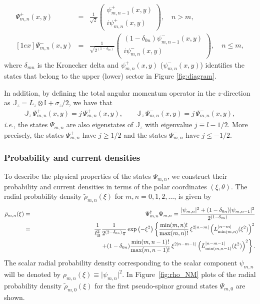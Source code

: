 \documentclass[aps,showpacs,showkeys]{revtex4}
\begin{document}
\begin{eqnarray}
\label{34aaa}
\Psi_{m,n}^{+}(x,y)&=&\frac{1}{\sqrt{2}}\left(\begin{array}{c}
\psi_{m,n-1}^{+}(x,y)\\
i\psi_{m,n}^{+}(x,y)
\end{array}\right), \quad n> m, 
\\ [1ex]
\Psi_{m,n}^{-}(x,y)&=&\frac{1}{\sqrt{2^{(1-\delta_{0n})}}}\left(\begin{array}{c}
(1-\delta_{0n})\psi_{m,n-1}^{-}(x,y)\\
i\psi_{m,n}^{-}(x,y)
\end{array}\right), \quad n\leq m,
\label{34bbb}
\end{eqnarray}
where $\delta_{mn}$ is the Kronecker delta and $\psi^+_{m,n}(x,y)$  ($\psi^-_{m,n}(x,y)$) identifies the states that belong to the upper (lower) sector in Figure \ref{fig:diagram}.


In addition, by defining the total angular momentum operator in the $z$-direction as $\mathbb{J}_z=L_z\otimes\mathbb{I}+\sigma_z/2$, we have that
\begin{eqnarray}\label{36}
 \mathbb{J}_z\,\Psi_{m,n}^{+}(x,y)=j\,\Psi_{m,n}^{+}(x,y), \qquad \mathbb{J}_z\,\Psi_{m,n}^{-}(x,y)=j\,\Psi_{m,n}^{-}(x,y), 
\end{eqnarray}
{\it i.e.}, the states $\Psi_{m,n}$ are also eigenstates of $\mathbb{J}_z$ with eigenvalue $j\equiv l-1/2$. More precisely, the states $\Psi_{m,n}^+$ have $j\geq 1/2$ and the states  $\Psi_{m,n}^-$ have  $j\leq-1/2$.


\subsubsection{Probability and current densities}\label{sec2.2.1}
To describe the physical properties of the states  $\Psi_{m,n}$, we construct their probability and current densities in terms of the polar coordinates $(\xi,\theta)$.
The radial probability density $\tilde{\rho}_{m,n}(\xi)$ for $m,n=0,1,2,\dots$, is given by
\begin{eqnarray}
 \nonumber\tilde{\rho}_{m,n}(\xi)&=&\Psi_{m,n}^\dagger \Psi_{m,n}=\frac{\vert\psi_{m,n} \vert^2+(1-\delta_{0n})\vert\psi_{m,n-1} \vert^2}{2^{(1-\delta_{0n})}}
\\
  &=&\frac1{\ell_{\rm B}^{2}} \frac{1}{2^{(2-\delta_{0n})}\pi} \exp\left(-\xi^2\right)\left\{\frac{\min(m,n)!}{\max(m,n)!}\,\xi^{2\vert n-m\vert}\left( L_{\min(m,n)}^{\vert n-m\vert} (\xi^2 )\right)^2\right.  
\nonumber
\\
 & &\left. \qquad\qquad\qquad\qquad\qquad\quad +(1-\delta_{0n})\frac{\min(m,n-1)!}{\max(m,n-1)!}\,\xi^{2\vert n-m-1\vert}\left(L_{\min(m,n-1)}^{\vert n-m-1\vert} (\xi^2 )\right)^2\right\}.
\label{37}
\end{eqnarray}
The scalar radial probability density  corresponding to the scalar component $\psi_{m,n}$ will be denoted by $\rho_{m,n}(\xi)\equiv\vert\psi_{m,n}\vert^2$. In Figure~\ref{fig:rho_NM} plots of the radial probability density $\tilde{\rho}_{m,0}(\xi)$ for the first pseudo-spinor ground states $\Psi_{m,0}$ are shown.
\end{document}
